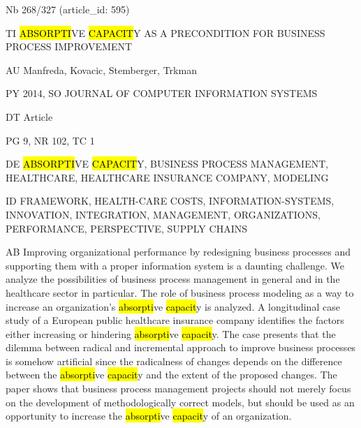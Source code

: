 \documentclass[a4paper]{article}
\begin{document}
\vspace*{-2cm}
Nb \tabto{0cm}268/327 (article\_id: 595)\par
TI \tabto{0cm}\hl{ABSORPTI}VE \hl{CAPACIT}Y AS A PRECONDITION FOR BUSINESS PROCESS IMPROVEMENT\par
AU \tabto{0cm}Manfreda, Kovacic, Stemberger, Trkman\par
PY \tabto{0cm}2014, SO JOURNAL OF COMPUTER INFORMATION SYSTEMS\par
DT \tabto{0cm}Article\par
PG \tabto{0cm}9, NR 102, TC 1\par
DE \tabto{0cm}\hl{ABSORPTI}VE \hl{CAPACIT}Y, BUSINESS PROCESS MANAGEMENT, HEALTHCARE, HEALTHCARE INSURANCE COMPANY, MODELING\par
ID \tabto{0cm}FRAMEWORK, HEALTH-CARE COSTS, INFORMATION-SYSTEMS, INNOVATION, INTEGRATION, MANAGEMENT, ORGANIZATIONS, PERFORMANCE, PERSPECTIVE, SUPPLY CHAINS\par
AB \tabto{0cm}Improving organizational performance by redesigning business processes and supporting them with a proper information system is a daunting challenge. We analyze the possibilities of business process management in general and in the healthcare sector in particular. The role of business process modeling as a way to increase an organization's \hl{absorpti}ve \hl{capacit}y is analyzed. A longitudinal case study of a European public healthcare insurance company identifies the factors either increasing or hindering \hl{absorpti}ve \hl{capacit}y. The case presents that the dilemma between radical and incremental approach to improve business processes is somehow artificial since the radicalness of changes depends on the difference between the \hl{absorpti}ve \hl{capacit}y and the extent of the proposed changes. The paper shows that business process management projects should not merely focus on the development of methodologically correct models, but should be used as an opportunity to increase the \hl{absorpti}ve \hl{capacit}y of an organization.\par
\clearpage
\end{document}
